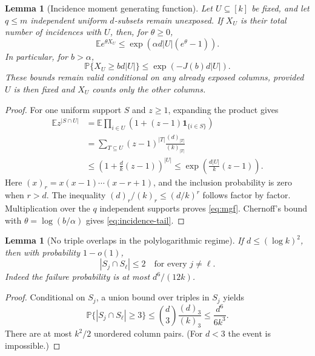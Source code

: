 \documentclass[11pt]{article}
\newtheorem{lemma}[theorem]{Lemma}
\theoremstyle{definition}
\theoremstyle{remark}
\newcommand{\PP}{\mathbb P}
\newcommand{\EE}{\mathbb E}
\newcommand{\abs}[1]{\left\lvert #1\right\rvert}
\newcommand{\ind}{\mathbf 1}
\begin{document}
\begin{lemma}[Incidence moment generating function]\label{lem:mgf}
Let $U\subseteq[k]$ be fixed, and let $q\leq m$ independent uniform $d$-subsets remain unexposed. If $X_U$ is their total number of incidences with $U$, then, for $\theta\geq0$,
\begin{equation}\label{eq:mgf}
 \EE e^{\theta X_U}
 \leq \exp\!\left(\alpha d\abs U(e^\theta-1)\right).
\end{equation}
In particular, for $b>\alpha$,
\begin{equation}\label{eq:incidence-tail}
 \PP\{X_U\geq b d\abs U\}
 \leq \exp\!\left(-J(b)d\abs U\right).
\end{equation}
These bounds remain valid conditional on any already exposed columns, provided $U$ is then fixed and $X_U$ counts only the other columns.
\end{lemma}
\begin{proof}
For one uniform support $S$ and $z\geq1$, expanding the product gives
\begin{align*}
 \EE z^{\abs{S\cap U}}
 &=\EE\prod_{i\in U}\left(1+(z-1)\ind_{\{i\in S\}}\right)\\
 &=\sum_{T\subseteq U}(z-1)^{\abs T}
       \frac{(d)_{\abs T}}{(k)_{\abs T}}\\
 &\leq \left(1+\frac dk(z-1)\right)^{\abs U}
 \leq\exp\!\left(\frac{d\abs U}{k}(z-1)\right).
\end{align*}
Here $(x)_r=x(x-1)\cdots(x-r+1)$, and the inclusion probability is zero when $r>d$. The inequality $(d)_r/(k)_r\leq(d/k)^r$ follows factor by factor. Multiplication over the $q$ independent supports proves \eqref{eq:mgf}. Chernoff's bound with $\theta=\log(b/\alpha)$ gives \eqref{eq:incidence-tail}.
\end{proof}

\begin{lemma}[No triple overlaps in the polylogarithmic regime]\label{lem:overlaps}
If $d\leq(\log k)^2$, then with probability $1-o(1)$,
\begin{equation}\label{eq:overlap}
 \abs{S_j\cap S_\ell}\leq2\quad\text{for every }j\ne\ell.
\end{equation}
Indeed the failure probability is at most $d^6/(12k)$.
\end{lemma}
\begin{proof}
Conditional on $S_j$, a union bound over triples in $S_j$ yields
\[
 \PP\{\abs{S_j\cap S_\ell}\geq3\}
 \leq {d\choose3}\frac{(d)_3}{(k)_3}
 \leq \frac{d^6}{6k^3}.
\]
There are at most $k^2/2$ unordered column pairs. (For $d<3$ the event is impossible.)
\end{proof}
\end{document}
